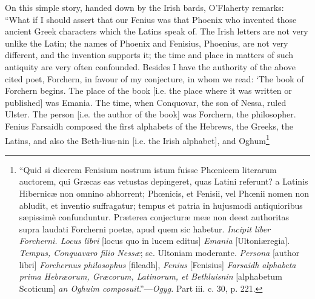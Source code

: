 \documentclass[11pt,oneside]{memoir}
\begin{document}
On this simple story, handed down by the Irish bards, O'Flaherty remarks: ``What if I should assert that our Fenius was that Phoenix who invented those ancient Greek characters which the Latins speak of.
The Irish letters are not very unlike the Latin; the names of Phoenix and Fenisius, Phoenius, are not very different, and the invention supports it; the time and place in matters of such antiquity are very often confounded.
Besides I have the authority of the above cited poet, Forchern, in favour of my conjecture, in whom we read: `The book of Forchern begins.
The place of the book [i.e. the place where it was written or published] was Emania.
The time, when Conquovar, the son of Nessa, ruled Ulster.
The person [i.e. the author of the book] was Forchern, the philosopher.
Fenius Farsaidh composed the first alphabets of the Hebrews, the Greeks, the Latins, and also the Beth-lius-nin [i.e. the Irish alphabet], and Oghum\footnote{
    ``Quid si dicerem Fenisium nostrum istum fuisse Ph{\oe}nicem literarum auctorem, qui Gr{\ae}cas eas vetustas depingeret, quas Latini referunt? a Latinis Hibernic{\ae} non omnino abhorrent; Ph{\oe}nicis, et Fenisii, vel Ph{\oe}nii nomen non abludit, et inventio suffragatur; tempus et patria in hujusmodi antiquioribus s{\ae}pissim\`{e} confunduntur.
    Pr{\ae}terea conjectur{\ae} me{\ae} non deest authoritas supra laudati Forcherni poet{\ae}, apud quem sic habetur.
    \textit{Incipit liber Forcherni. Locus libri} [locus quo in lucem editus] \textit {Emania} [Ultoni\ae regia]. \textit{Tempus, Conquavaro filio Ness\ae}; sc. Ultoniam moderante. \textit{Persona} [author libri] \textit{Forchernus philosophus} [fileadh], \textit{Fenius} [Fenisius] \textit{Farsaidh alphabeta prima Hebr{\ae}orum, Gr{\ae}corum, Latinorum, et Bethluisnin} [alphabetum Scoticum] \textit{an Oghuim composuit}.''---\textit{Ogyg.} Part iii. c. 30, p. 221.

}
\end{document}
